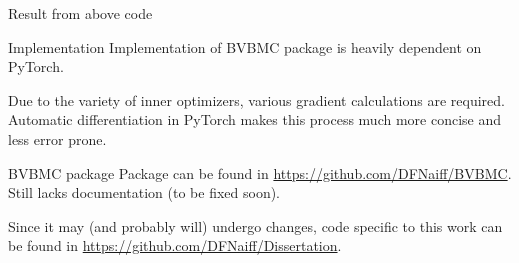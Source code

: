 \documentclass{beamer}
\begin{document}
\begin{frame}
\begin{block}{Result from above code}
\begin{figure}
	\centering
	\captionsetup[subfigure]{labelformat=empty}
\end{figure}
\end{block}
\end{frame}
\begin{frame}
\begin{block}{Implementation}
Implementation of BVBMC package is heavily dependent on PyTorch.

Due to the variety of inner optimizers, various gradient calculations are required. Automatic differentiation in PyTorch makes this process much more concise and less error prone.
\end{block}

\begin{block}{BVBMC package}
	Package can be found in \url{https://github.com/DFNaiff/BVBMC}. Still lacks documentation (to be fixed soon).
	
	Since it may (and probably will) undergo changes, code specific to this work can be found in \url{https://github.com/DFNaiff/Dissertation}.
\end{block}

\end{frame}
\end{document}
